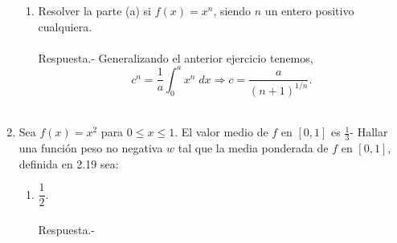 \begin{enumerate}
\begin{enumerate}[\bfseries (a)]
	\item Resolver la parte (a) si $f(x) = x^n$, siendo $n$ un entero positivo cualquiera.\\\\
	    Respuesta.-\; Generalizando el anterior ejercicio tenemos,
	    $$c^n = \frac{1}{a}\int_0^a x^n \; dx \Longrightarrow c = \dfrac{a}{(n+1)^{1/n}}.$$\\

    \end{enumerate}

\item Sea $f(x)=x^2$ para $0\leq x \leq 1$. El valor medio de $f$ en $[0,1]$ es $\frac{1}{3}$- Hallar una función peso no negativa $w$ tal que la media ponderada de $f$ en $[0,1]$, definida en 2.19 sea:

    \begin{enumerate}[\bfseries (a)]

	\item $\dfrac{1}{2}.$\\\\
	    Respuesta.-\; 

    \end{enumerate}

\end{enumerate}
